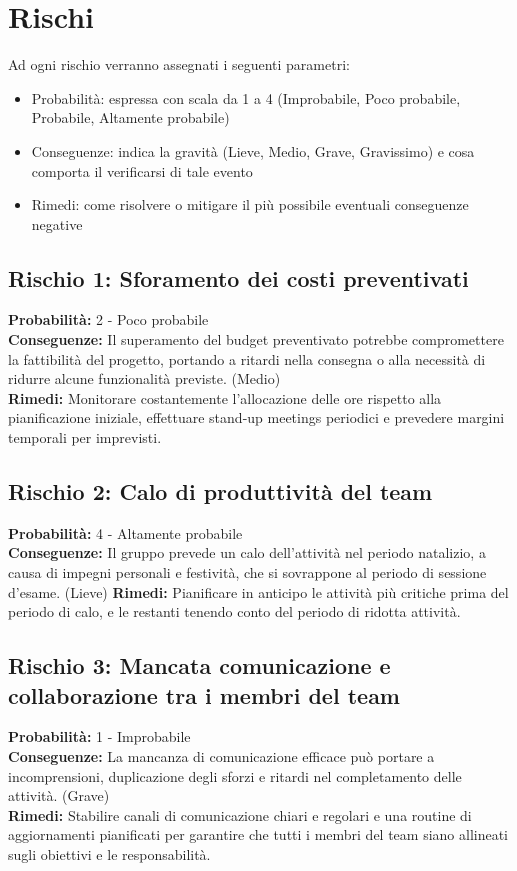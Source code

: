 \documentclass[a4paper,12pt]{article}
\begin{document}
\vspace{0.5cm}
\section{Rischi}
Ad ogni rischio verranno assegnati i seguenti parametri:
\begin{itemize}
    \item Probabilità: espressa con scala da 1 a 4 (Improbabile, Poco probabile, Probabile, Altamente probabile)
    \item Conseguenze: indica la gravità (Lieve, Medio, Grave, Gravissimo) e cosa comporta il verificarsi di tale evento
    \item Rimedi: come risolvere o mitigare il più possibile eventuali conseguenze negative
\end{itemize}

\subsection{Rischio 1: Sforamento dei costi preventivati}
\textbf{Probabilità:} 2 - Poco probabile\\
\textbf{Conseguenze:} Il superamento del budget preventivato potrebbe compromettere la fattibilità del progetto, portando a ritardi nella consegna o alla necessità di ridurre alcune funzionalità previste. (Medio)\\
\textbf{Rimedi:} Monitorare costantemente l'allocazione delle ore rispetto alla pianificazione iniziale, effettuare stand-up meetings periodici e prevedere margini temporali per imprevisti.

\subsection{Rischio 2: Calo di produttività del team}
\textbf{Probabilità:} 4 - Altamente probabile\\
\textbf{Conseguenze:} Il gruppo prevede un calo dell'attività nel periodo natalizio, a causa di impegni personali e festività, che si sovrappone al periodo di sessione d'esame. (Lieve)
\textbf{Rimedi:} Pianificare in anticipo le attività più critiche prima del periodo di calo, e le restanti tenendo conto del periodo di ridotta attività.  

\subsection{Rischio 3: Mancata comunicazione e collaborazione tra i membri del team}
\textbf{Probabilità:} 1 - Improbabile\\
\textbf{Conseguenze:} La mancanza di comunicazione efficace può portare a incomprensioni, duplicazione degli sforzi e ritardi nel completamento delle attività. (Grave)\\
\textbf{Rimedi:} Stabilire canali di comunicazione chiari e regolari e una routine di aggiornamenti pianificati per garantire che tutti i membri del team siano allineati sugli obiettivi e le responsabilità.
\end{document}
